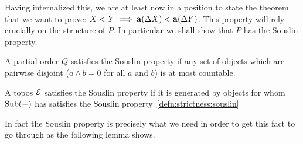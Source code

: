 Having internalized this, we are at least now in a position to state
the theorem that we want to prove:
$X < Y \implies \mathbf{a}(\Delta X) < \mathbf{a}(\Delta Y)$. This
property will rely crucially on the structure of $P$. In particular we
shall show that $P$ has the Souslin property.

\begin{defn}\label{defn:strictness:souslin}
  A partial order $Q$ satisfies the Souslin property if any set of
  objects which are pairwise disjoint ($a \wedge b = 0$ for all $a$
  and $b$) is at most countable.
\end{defn}
\begin{defn}\label{defn:strictness:souslintopos}
  A topos $\mathcal{E}$ satisfies the Souslin property if it is generated by
  objects for whom $\operatorname{Sub}(-)$ has satisfies the Souslin
  property~\ref{defn:strictness:souslin}
\end{defn}

In fact the Souslin property is precisely what we need in order to get
this fact to go through as the following lemma shows.

